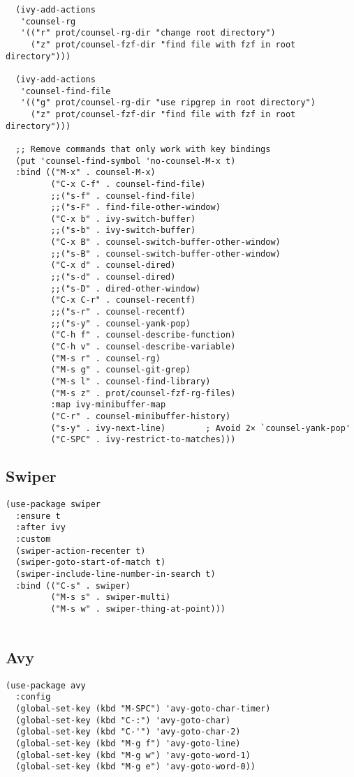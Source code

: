 \documentclass[12pt]{article}
\begin{document}
\begin{verbatim}
  (ivy-add-actions
   'counsel-rg
   '(("r" prot/counsel-rg-dir "change root directory")
     ("z" prot/counsel-fzf-dir "find file with fzf in root directory")))

  (ivy-add-actions
   'counsel-find-file
   '(("g" prot/counsel-rg-dir "use ripgrep in root directory")
     ("z" prot/counsel-fzf-dir "find file with fzf in root directory")))

  ;; Remove commands that only work with key bindings
  (put 'counsel-find-symbol 'no-counsel-M-x t)
  :bind (("M-x" . counsel-M-x)
         ("C-x C-f" . counsel-find-file)
         ;;("s-f" . counsel-find-file)
         ;;("s-F" . find-file-other-window)
         ("C-x b" . ivy-switch-buffer)
         ;;("s-b" . ivy-switch-buffer)
         ("C-x B" . counsel-switch-buffer-other-window)
         ;;("s-B" . counsel-switch-buffer-other-window)
         ("C-x d" . counsel-dired)
         ;;("s-d" . counsel-dired)
         ;;("s-D" . dired-other-window)
         ("C-x C-r" . counsel-recentf)
         ;;("s-r" . counsel-recentf)
         ;;("s-y" . counsel-yank-pop)
         ("C-h f" . counsel-describe-function)
         ("C-h v" . counsel-describe-variable)
         ("M-s r" . counsel-rg)
         ("M-s g" . counsel-git-grep)
         ("M-s l" . counsel-find-library)
         ("M-s z" . prot/counsel-fzf-rg-files)
         :map ivy-minibuffer-map
         ("C-r" . counsel-minibuffer-history)
         ("s-y" . ivy-next-line)        ; Avoid 2× `counsel-yank-pop'
         ("C-SPC" . ivy-restrict-to-matches)))
\end{verbatim}

\subsection{Swiper}
\label{sec:org8ede04c}
\begin{verbatim}
(use-package swiper
  :ensure t
  :after ivy
  :custom
  (swiper-action-recenter t)
  (swiper-goto-start-of-match t)
  (swiper-include-line-number-in-search t)
  :bind (("C-s" . swiper)
         ("M-s s" . swiper-multi)
         ("M-s w" . swiper-thing-at-point)))


\end{verbatim}

\subsection{Avy}
\label{sec:orgdb16f45}


\begin{verbatim}
(use-package avy
  :config
  (global-set-key (kbd "M-SPC") 'avy-goto-char-timer)
  (global-set-key (kbd "C-:") 'avy-goto-char)
  (global-set-key (kbd "C-'") 'avy-goto-char-2)
  (global-set-key (kbd "M-g f") 'avy-goto-line)
  (global-set-key (kbd "M-g w") 'avy-goto-word-1)
  (global-set-key (kbd "M-g e") 'avy-goto-word-0))

\end{verbatim}
\end{document}
